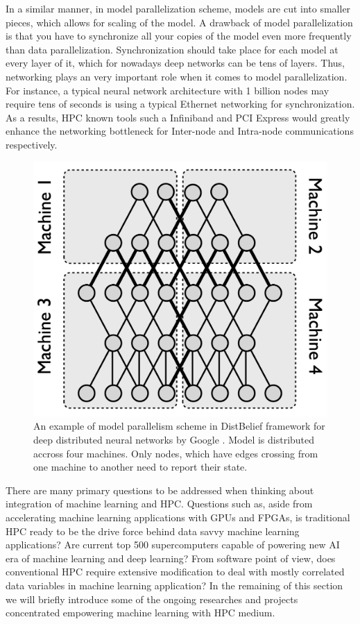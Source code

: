 \documentclass[runningheads,a4paper]{llncs}
\begin{document}
In a similar manner, in model parallelization scheme, models are cut into smaller pieces, which allows for scaling of the model. A drawback of model parallelization is that you have to synchronize all your copies of the model even more frequently than data parallelization. Synchronization should take place for each model at every layer of it, which for nowadays deep networks can be tens of layers. Thus, networking plays an very important role when it comes to model parallelization. For instance, a typical neural network architecture with 1 billion nodes may require tens of seconds is using a typical Ethernet networking for synchronization. As a results, HPC known tools such a Infiniband and PCI Express would greatly enhance the networking bottleneck for Inter-node and Intra-node communications respectively.\\
\begin{figure}[h]
	\includegraphics[scale=0.3]{./images/model_parallelism.png}
	\centering
	\caption{An example of model parallelism scheme in DistBelief framework for deep distributed neural networks by Google \cite{dean2012large}. Model is distributed accross four machines. Only nodes, which have edges crossing from one machine to another need to report their state.}
	\label{fig:model_parallelism}
\end{figure}

There are many primary questions to be addressed when thinking about integration of machine learning and HPC. Questions such as, aside from accelerating machine learning applications with GPUs and FPGAs, is traditional HPC ready to be the drive force behind data savvy machine learning applications? Are current top 500 supercomputers capable of powering new AI era of machine learning and deep learning? From software point of view, does conventional HPC require extensive modification to deal with mostly correlated data variables in machine learning application?
In the remaining of this section we will briefly introduce some of the ongoing researches and projects concentrated empowering machine learning with HPC medium.
\end{document}
